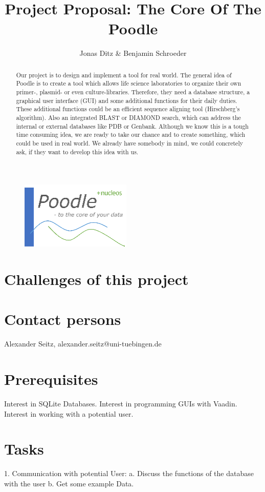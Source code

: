 \documentclass[]{article}
\title{Project Proposal: The Core Of The Poodle}
\author{Jonas Ditz  \& Benjamin Schroeder}
\begin{document}
\maketitle
\begin{figure}[h]
	\centering
	\includegraphics[scale=0.35]{../img/logo_poodle.png}
\end{figure}

\begin{abstract}
Our project is to design and implement a tool for real world. The general idea of Poodle is to create a tool which allows life science laboratories to organize their own primer-, plasmid- or even culture-libraries. Therefore, they need a database structure, a graphical user interface (GUI) and some additional functions for their daily duties. These additional functions could be an efficient sequence aligning tool (Hirschberg's algorithm). Also an integrated BLAST or DIAMOND search, which can address the internal or external databases like PDB or Genbank. Although we know this is a tough time consuming idea, we are ready to take our chance and to create something, which could be used in real world. We already have somebody in mind, we could concretely ask, if they want to develop this idea with us.
\end{abstract}
\newpage
\section{Challenges of this project}
\section{Contact persons} Alexander Seitz, alexander.seitz@uni-tuebingen.de

\section{Prerequisites}
Interest in SQLite Databases.
Interest in programming GUIs with Vaadin.
Interest in working with a potential user.

\section{Tasks}
1. Communication with potential User:
	a. Discuss the functions of the database with the user
	b. Get some example Data.
\end{document}
